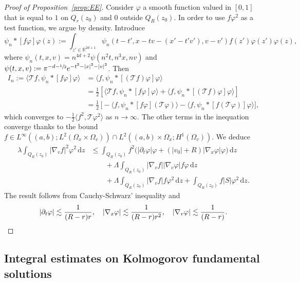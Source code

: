 \documentclass[11pt]{article}
\numberwithin{equation}{section}\let\oldbigcup\bigcup
\let\mathcal\mathscr
\theoremstyle{definition}
\theoremstyle{remark}
\newcommand\R{{\mathbb R}}
\newcommand{\cT}{\mathcal T}
\newcommand{\dd}{{\, \mathrm d}}
\begin{document}
\begin{proof}[Proof of Proposition~\ref{prop:EE}]
Consider $\varphi$ a smooth function valued in $[0,1]$ that is
equal to $1$ on $Q_r(z_0)$ and $0$ outside $Q_R(z_0)$. In order
to use $f\varphi^2$ as a test function, we argue by
density. Introduce
\begin{equation*}
\psi_n * [f \varphi] \varphi (z) :=
\int_{z'\in\R^{2d+1}} \psi_n \left(t-t',x-tv-(x'-t'v'),v-v'
\right) f(z') \varphi(z') \varphi(z),
\end{equation*}
where $\psi_n(t,x,v)=n^{4d+2} \psi(n^2 t,n^3 x, n v)$ and
$\psi(t,x,v):= \pi^{-d-\sfrac{1}{2}} e^{-t^2-|x|^2-|v|^2}$.
Then
\begin{align*}
I_n:= \big\langle \cT f, \psi_n * [f \varphi] \varphi
\big\rangle
& = \big\langle f, \psi_n * [(\cT f) \varphi] \varphi
\big\rangle \\
& = \frac{1}{2} \left[\big\langle \cT f, \psi_n * [f \varphi] \varphi
\big\rangle + \big\langle f, \psi_n * [(\cT f) \varphi] \varphi
\big\rangle \right] \\
& = \frac{1}{2}\, \bigl[-\big\langle f, \psi_n * [f \varphi] (\cT\varphi)
\big\rangle -\big\langle f, \psi_n * [f (\cT \varphi)] \varphi
\big\rangle \bigr],
\end{align*}
which converges to
$-\frac{1}{2} \big\langle f^2, \cT\varphi^2 \big\rangle$ as $n
\to \infty$. The
other terms in the inequation converge thanks to the bound
$f \in L^\infty ((a,b);L^2 (\Omega_x \times \Omega_v)) \cap L^2
((a,b) \times \Omega_x;H^1(\Omega_v))$. We deduce
\begin{align*}
\lambda \int_{Q_R(z_0)} |\nabla_v f|^2
\varphi^2 \dd z
& \le \int_{Q_R(z_0)} f^2 \Big( |\partial_t \varphi|
\varphi + (|v_0|+R) | \nabla_x \varphi| \varphi \Big) \dd z\\
& \qquad + \Lambda \int_{Q_R(z_0)} |\nabla_v
f| |\nabla_v \varphi| f \varphi \dd z \\
& \qquad + \Lambda
\int_{Q_R(z_0)} |\nabla_v f| f \varphi^2 \dd z +
\int_{Q_R(z_0)} f |S| \varphi^2 \dd z.
\end{align*}
The result follows from Cauchy-Schwarz' inequality
and
\[
|\partial_t \varphi| \lesssim \frac{1}{(R-r)r},\quad
|\nabla_x \varphi| \lesssim \frac{1}{(R-r)r^2},\quad
|\nabla_v \varphi| \lesssim \frac{1}{(R-r)}.\qedhere
\]
\end{proof}

\subsection{Integral estimates on Kolmogorov fundamental
solutions}
\end{document}
